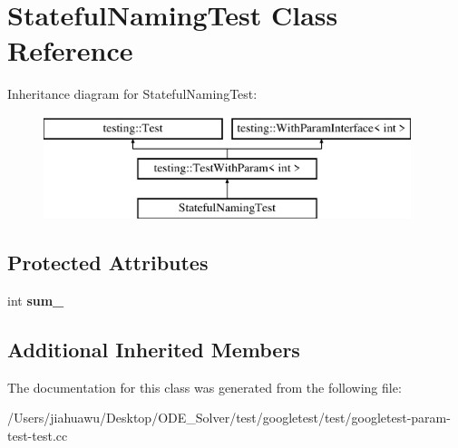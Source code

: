 \hypertarget{class_stateful_naming_test}{}\section{Stateful\+Naming\+Test Class Reference}
\label{class_stateful_naming_test}
Inheritance diagram for Stateful\+Naming\+Test\+:\begin{figure}[H]
\begin{center}
\leavevmode
\includegraphics[height=3.000000cm]{class_stateful_naming_test}
\end{center}
\end{figure}
\subsection*{Protected Attributes}
\begin{DoxyCompactItemize}
\item 
\mbox{\label{class_stateful_naming_test_ad719a1c2919c304bfe840313142a376a}} 
int {\bfseries sum\+\_\+}
\end{DoxyCompactItemize}
\subsection*{Additional Inherited Members}


The documentation for this class was generated from the following file\+:\begin{DoxyCompactItemize}
\item 
/\+Users/jiahuawu/\+Desktop/\+O\+D\+E\+\_\+\+Solver/test/googletest/test/googletest-\/param-\/test-\/test.\+cc\end{DoxyCompactItemize}
